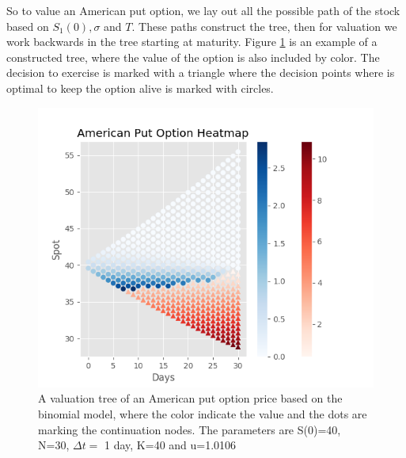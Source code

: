 So to value an American put option, we lay out all the possible path of the stock based on $S_1(0),\sigma$ and $T$. These paths construct the tree, then for valuation we work backwards in the tree starting at maturity. Figure \ref{fig:BinomialTree} is an example of a constructed tree, where the value of the option is also included by color. The decision to exercise is marked with a triangle where the decision points where is optimal to keep the option alive is marked with circles. \\

\begin{figure}[th]
\centering
\includegraphics{Figures/BinomialTree.png}
\decoRule
\caption[Binomial Tree]{A valuation tree of an American put option price based on the binomial model, where the color indicate the value and the dots are marking the continuation nodes. The parameters are S(0)=40, N=30, $\Delta t =$ 1 day, K=40 and u=1.0106}
\label{fig:BinomialTree}
\end{figure}

